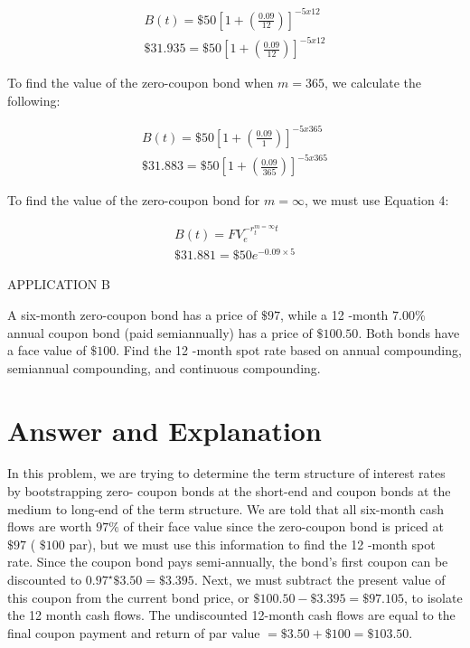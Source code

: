 \documentclass[11pt]{article}
\begin{document}
$$
\begin{gathered}
B(t)=\$ 50\left[1+\left(\frac{0.09}{12}\right)\right]^{-5 x 12} \\
\$ 31.935=\$ 50\left[1+\left(\frac{0.09}{12}\right)\right]^{-5 x 12}
\end{gathered}
$$

To find the value of the zero-coupon bond when $m=365$, we calculate the following:

$$
\begin{gathered}
B(t)=\$ 50\left[1+\left(\frac{0.09}{1}\right)\right]^{-5 x 365} \\
\$ 31.883=\$ 50\left[1+\left(\frac{0.09}{365}\right)\right]^{-5 x 365}
\end{gathered}
$$

To find the value of the zero-coupon bond for $m=\infty$, we must use Equation 4:

$$
\begin{gathered}
B(t)=F V_{e}^{-r_{t}^{m=\infty} t} \\
\$ 31.881=\$ 50 e^{-0.09 \times 5}
\end{gathered}
$$

APPLICATION B

A six-month zero-coupon bond has a price of $\$ 97$, while a 12 -month $7.00 \%$ annual coupon bond (paid semiannually) has a price of $\$ 100.50$. Both bonds have a face value of $\$ 100$. Find the 12 -month spot rate based on annual compounding, semiannual compounding, and continuous compounding.

\section*{Answer and Explanation}
In this problem, we are trying to determine the term structure of interest rates by bootstrapping zero- coupon bonds at the short-end and coupon bonds at the medium to long-end of the term structure. We are told that all six-month cash flows are worth $97 \%$ of their face value since the zero-coupon bond is priced at $\$ 97$ ( $\$ 100$ par), but we must use this information to find the 12 -month spot rate. Since the coupon bond pays semi-annually, the bond's first coupon can be discounted to $0.97^{\star} \$ 3.50=\$ 3.395$. Next, we must subtract the present value of this coupon from the current bond price, or $\$ 100.50-\$ 3.395=\$ 97.105$, to isolate the 12 month cash flows. The undiscounted 12-month cash flows are equal to the final coupon payment and return of par value $=\$ 3.50+\$ 100=\$ 103.50$.
\end{document}
